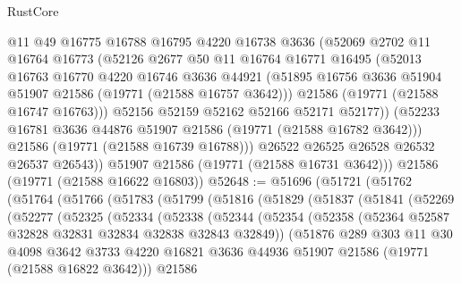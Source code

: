 \begin{lexlean}{RustCore}
\begin{coremodule}
            @11
            @49
            @16775
            @16788
            @16795
            @4220
            @16738
            @3636
            (@52069
              @2702
              @11
              @16764
              @16773
              (@52126
                @2677
                @50
                @11
                @16764
                @16771
                @16495
                (@52013
                  @16763
                  @16770
                  @4220
                  @16746
                  @3636
                  @44921
                  (@51895 @16756 @3636 @51904 @51907 @21586 (@19771 (@21588 @16757 @3642)))
                  @21586
                  (@19771 (@21588 @16747 @16763)))
                @52156
                @52159
                @52162
                @52166
                @52171
                @52177))
            (@52233 @16781 @3636 @44876 @51907 @21586 (@19771 (@21588 @16782 @3642)))
            @21586
            (@19771 (@21588 @16739 @16788)))
          @26522
          @26525
          @26528
          @26532
          @26537
          @26543))
      @51907
      @21586
      (@19771 (@21588 @16731 @3642)))
    @21586
    (@19771 (@21588 @16622 @16803))
@52648 := @51696
    (@51721
      (@51762
        (@51764
          (@51766
            (@51783
              (@51799
                (@51816
                  (@51829
                    (@51837
                      (@51841
                        (@52269
                          (@52277
                            (@52325
                              (@52334
                                (@52338
                                  (@52344
                                    (@52354
                                      (@52358
                                        (@52364 @52587 @32828 @32831 @32834 @32838 @32843 @32849))
                                      (@51876
                                        @289
                                        @303
                                        @11
                                        @30
                                        @4098
                                        @3642
                                        @3733
                                        @4220
                                        @16821
                                        @3636
                                        @44936
                                        @51907
                                        @21586
                                        (@19771 (@21588 @16822 @3642)))
                                      @21586

\end{coremodule}
\end{lexlean}
